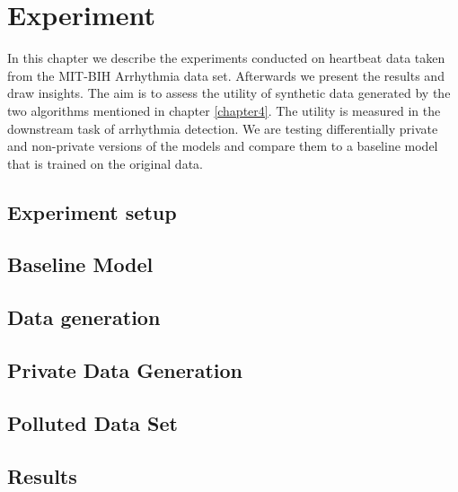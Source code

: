\section{Experiment}
In this chapter we describe the experiments conducted on heartbeat data taken from the MIT-BIH Arrhythmia data set. Afterwards we present the results and draw insights. The aim is to assess the utility of synthetic data generated by the two algorithms mentioned in chapter \ref{chapter4}. The utility is measured in the downstream task of arrhythmia detection. We are testing differentially private and non-private versions of the models and compare them to a baseline model that is trained on the original data.

\subsection{Experiment setup}

\subsection{Baseline Model}

\subsection{Data generation}

\subsection{Private Data Generation}


\subsection{Polluted Data Set}

\subsection{Results}